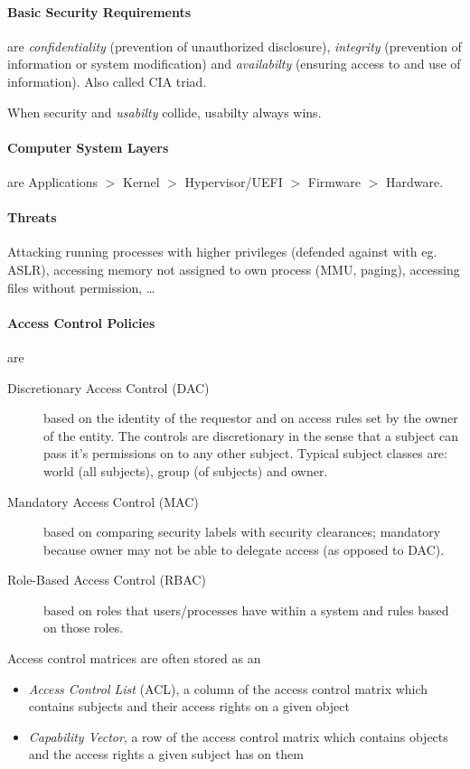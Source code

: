 \documentclass{article}
\begin{document}
\begin{multicols}{1}
\paragraph{Basic Security Requirements} are \emph{confidentiality} (prevention of unauthorized disclosure), \emph{integrity} (prevention of information or system modification) and \emph{availabilty} (ensuring access to and use of information). Also called CIA triad.

When security and \emph{usabilty} collide, usabilty always wins.

\paragraph{Computer System Layers} are Applications $>$ Kernel $>$ Hypervisor/UEFI $>$ Firmware $>$ Hardware.

\paragraph{Threats} Attacking running processes with higher privileges (defended against with eg. ASLR), accessing memory not assigned to own process (MMU, paging), accessing files without permission, \ldots

\paragraph{Access Control Policies} are

\begin{description}
    \item[Discretionary Access Control (DAC)] based on the identity of the requestor and on access rules set by the owner of the entity. The controls are discretionary in the sense that a subject can pass it's permissions on to any other subject. Typical subject classes are: world (all subjects), group (of subjects) and owner.
    \item[Mandatory Access Control (MAC)] based on comparing security labels with security clearances; mandatory because owner may not be able to delegate access (as opposed to DAC).
    \item[Role-Based Access Control (RBAC)] based on roles that users/processes have within a system and rules based on those roles. 
\end{description}

Access control matrices are often stored as an

\begin{itemize}
    \item \emph{Access Control List} (ACL), a column of the access control matrix which contains subjects and their access rights on a given object
    \item \emph{Capability Vector}, a row of the access control matrix which contains objects and the access rights a given subject has on them 
\end{itemize}


\end{multicols}
\end{document}
